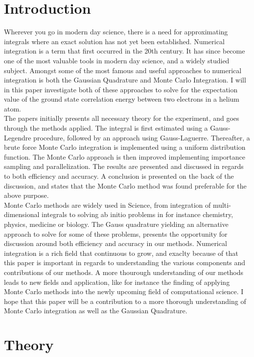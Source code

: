 \documentclass[%
reprint,
amsmath,amssymb,
aps,
]{revtex4-1}
\begin{document}
\section{Introduction}
\vspace{3mm}
\twocolumngrid 
Wherever you go in modern day science, there is a need for approximating integrals where an exact solution has not yet been established. Numerical integration is a term that first occurred in the 20th century. It has since become one of the most valuable tools in modern day science, and a widely studied subject. Amongst some of the most famous and useful approaches to numerical integration is both the Gaussian Quadrature and Monte Carlo Integration. I will in this paper investigate both of these approaches to solve for the expectation value of the ground state correlation energy between two electrons in a helium atom. \\
\indent The papers initially presents all necessary theory for the experiment, and goes through the methods applied. The integral is first estimated using a Gauss-Legendre procedure, followed by an approach using Gauss-Laguerre. Thereafter, a brute force Monte Carlo integration is implemented using a uniform distribution function. The Monte Carlo approach is then improved implementing importance sampling and parallelization. The results are presented and discussed in regards to both efficiency and accuracy. A conclusion is presented on the back of the discussion, and states that the Monte Carlo method was found preferable for the above purpose. \\
Monte Carlo methods are widely used in Science, from integration of multi-dimensional integrals to solving ab initio problems in for instance chemistry, physics, medicine or biology. The Gauss quadrature yielding an alternative approach to solve for some of these problems, presents the opportunity for discussion around both efficiency and accuracy in our methods. Numerical integration is a rich field that continuous to grow, and exaclty because of that this paper is important in regards to understanding the various components and contributions of our methods. A more thourough understanding of our methods leads to new fields and application, like for instance the finding of applying Monte Carlo methods into the newly upcoming field of computational science. I hope that this paper will be a contribution to a more thorough understanding of Monte Carlo integration as well as the Gaussian Quadrature. \newpage 
 
\section{Theory}
\end{document}
